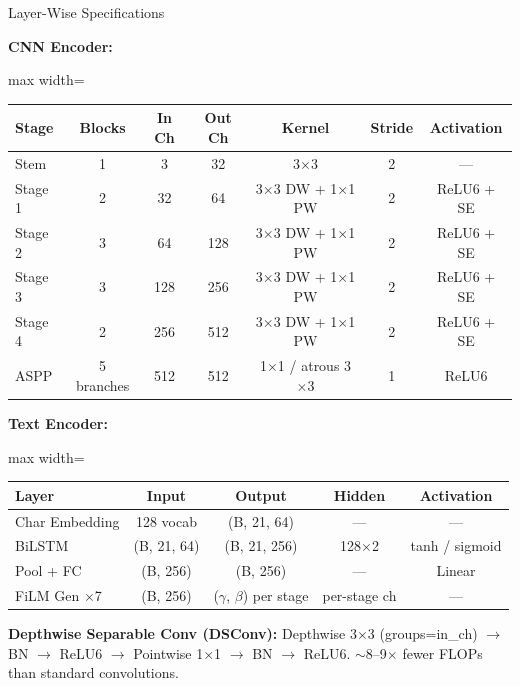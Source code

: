 \documentclass[aspectratio=169, 10pt]{beamer}
\begin{document}
\begin{frame}{Layer-Wise Specifications}
\footnotesize

\textbf{CNN Encoder:}

\medskip
\begin{adjustbox}{max width=\textwidth}
\begin{tabular}{lcccccc}
\toprule
\textbf{Stage} & \textbf{Blocks} & \textbf{In Ch} & \textbf{Out Ch} & \textbf{Kernel} & \textbf{Stride} & \textbf{Activation} \\
\midrule
Stem      & 1 & 3   & 32  & 3$\times$3              & 2 & --- \\
Stage 1   & 2 & 32  & 64  & 3$\times$3 DW + 1$\times$1 PW & 2 & ReLU6 + SE \\
Stage 2   & 3 & 64  & 128 & 3$\times$3 DW + 1$\times$1 PW & 2 & ReLU6 + SE \\
Stage 3   & 3 & 128 & 256 & 3$\times$3 DW + 1$\times$1 PW & 2 & ReLU6 + SE \\
Stage 4   & 2 & 256 & 512 & 3$\times$3 DW + 1$\times$1 PW & 2 & ReLU6 + SE \\
ASPP      & 5 branches & 512 & 512 & 1$\times$1 / atrous 3$\times$3 & 1 & ReLU6 \\
\bottomrule
\end{tabular}
\end{adjustbox}

\bigskip
\textbf{Text Encoder:}

\medskip
\begin{adjustbox}{max width=\textwidth}
\begin{tabular}{lcccc}
\toprule
\textbf{Layer} & \textbf{Input} & \textbf{Output} & \textbf{Hidden} & \textbf{Activation} \\
\midrule
Char Embedding & 128 vocab       & (B, 21, 64)   & ---       & --- \\
BiLSTM         & (B, 21, 64)     & (B, 21, 256)  & 128$\times$2 & tanh / sigmoid \\
Pool + FC      & (B, 256)        & (B, 256)      & ---       & Linear \\
FiLM Gen $\times$7 & (B, 256)   & ($\gamma$, $\beta$) per stage & per-stage ch & --- \\
\bottomrule
\end{tabular}
\end{adjustbox}

\bigskip
\textbf{Depthwise Separable Conv (DSConv):} Depthwise 3$\times$3 (groups=in\_ch) $\to$ BN $\to$ ReLU6 $\to$ Pointwise 1$\times$1 $\to$ BN $\to$ ReLU6.  $\sim$8--9$\times$ fewer FLOPs than standard convolutions.

\end{frame}
\end{document}
